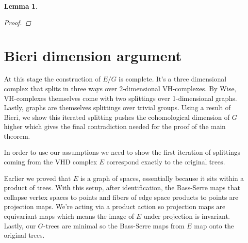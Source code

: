 \documentclass[12pt,parskip=full]{report}
\theoremstyle{plain}
\newtheorem{lem}[thm]{Lemma}
\theoremstyle{definition}
\begin{document}
\begin{lem}
\begin{proof}
        
    

    \end{proof}
\end{lem}


\section{Bieri dimension argument}

At this stage the construction of \(E/G\) is complete. It's a three dimensional complex that splits in three ways over 2-dimensional VH-complexes. By Wise, VH-complexes themselves come with two splittings over 1-dimensional graphs. Lastly, graphs are themselves splittings over trivial groups. Using a result of Bieri, we show this iterated splitting pushes the cohomological dimension of \(G\) higher which gives the final contradiction needed for the proof of the main theorem.

In order to use our assumptions we need to show the first iteration of splittings coming from the VHD complex \(E\) correspond exactly to the original trees.

Earlier we proved that \(E\) is a graph of spaces, essentially because it sits within a product of trees. With this setup, after identification, the Bass-Serre maps that collapse vertex spaces to points and fibers of edge space products to points are projection maps. We're acting via a product action so projection maps are equivariant maps which means the image of \(E\) under projection is invariant. Lastly, our \(G\)-trees are minimal so the Bass-Serre maps from \(E\) map onto the original trees.
\end{document}
